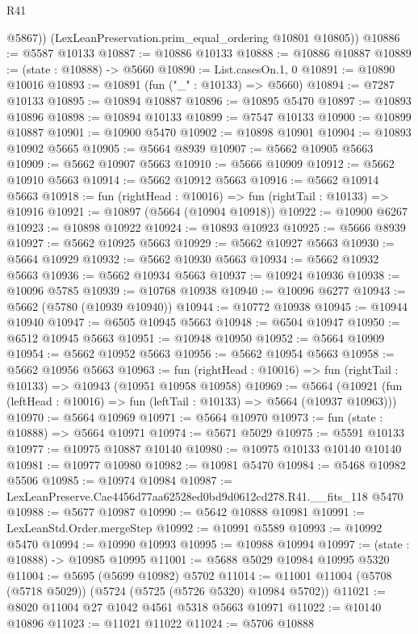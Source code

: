 \begin{lexlean}{R41}
\begin{coremodule}
          @5867))
      (LexLeanPreservation.prim_equal_ordering @10801 @10805))
@10886 := @5587 @10133
@10887 := @10886 @10133
@10888 := @10886 @10887
@10889 := (state : @10888) -> @5660
@10890 := List.casesOn.{1, 0}
@10891 := @10890 @10016
@10893 := @10891 (fun ("_" : @10133) => @5660)
@10894 := @7287 @10133
@10895 := @10894 @10887
@10896 := @10895 @5470
@10897 := @10893 @10896
@10898 := @10894 @10133
@10899 := @7547 @10133
@10900 := @10899 @10887
@10901 := @10900 @5470
@10902 := @10898 @10901
@10904 := @10893 @10902 @5665
@10905 := @5664 @8939
@10907 := @5662 @10905 @5663
@10909 := @5662 @10907 @5663
@10910 := @5666 @10909
@10912 := @5662 @10910 @5663
@10914 := @5662 @10912 @5663
@10916 := @5662 @10914 @5663
@10918 := fun (rightHead : @10016) => fun (rightTail : @10133) => @10916
@10921 := @10897 (@5664 (@10904 @10918))
@10922 := @10900 @6267
@10923 := @10898 @10922
@10924 := @10893 @10923
@10925 := @5666 @8939
@10927 := @5662 @10925 @5663
@10929 := @5662 @10927 @5663
@10930 := @5664 @10929
@10932 := @5662 @10930 @5663
@10934 := @5662 @10932 @5663
@10936 := @5662 @10934 @5663
@10937 := @10924 @10936
@10938 := @10096 @5785
@10939 := @10768 @10938
@10940 := @10096 @6277
@10943 := @5662 (@5780 (@10939 @10940))
@10944 := @10772 @10938
@10945 := @10944 @10940
@10947 := @6505 @10945 @5663
@10948 := @6504 @10947
@10950 := @6512 @10945 @5663
@10951 := @10948 @10950
@10952 := @5664 @10909
@10954 := @5662 @10952 @5663
@10956 := @5662 @10954 @5663
@10958 := @5662 @10956 @5663
@10963 := fun (rightHead : @10016) => fun (rightTail : @10133) => @10943 (@10951 @10958 @10958)
@10969 := @5664
    (@10921 (fun (leftHead : @10016) => fun (leftTail : @10133) => @5664 (@10937 @10963)))
@10970 := @5664 @10969
@10971 := @5664 @10970
@10973 := fun (state : @10888) => @5664 @10971
@10974 := @5671 @5029
@10975 := @5591 @10133
@10977 := @10975 @10887 @10140
@10980 := @10975 @10133 @10140 @10140
@10981 := @10977 @10980
@10982 := @10981 @5470
@10984 := @5468 @10982 @5506
@10985 := @10974 @10984
@10987 := LexLeanPreserve.Cae4456d77aa62528ed0bd9d0612cd278.R41.__fits_118 @5470
@10988 := @5677 @10987
@10990 := @5642 @10888 @10981
@10991 := LexLeanStd.Order.mergeStep
@10992 := @10991 @5589
@10993 := @10992 @5470
@10994 := @10990 @10993
@10995 := @10988 @10994
@10997 := (state : @10888) -> @10985 @10995
@11001 := @5688 @5029 @10984 @10995 @5320
@11004 := @5695 (@5699 @10982) @5702
@11014 := @11001 @11004 (@5708 (@5718 @5029)) (@5724 (@5725 (@5726 @5320) @10984 @5702))
@11021 := @8020 @11004 @27 @1042 @4561 @5318 @5663 @10971
@11022 := @10140 @10896
@11023 := @11021 @11022
@11024 := @5706 @10888

\end{coremodule}
\end{lexlean}
